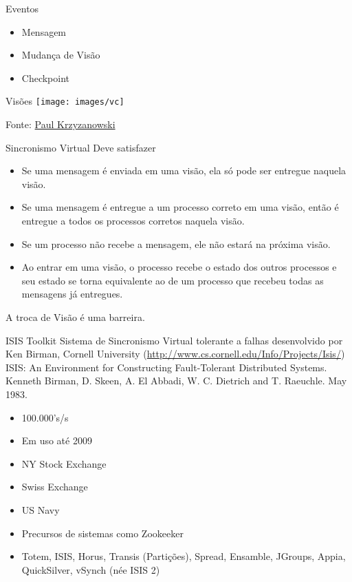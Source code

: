 \begin{frame}{Eventos}
\begin{itemize}
	\item Mensagem
	\item Mudança de Visão
	\item Checkpoint
\end{itemize}
\end{frame}

\begin{frame}{Visões}
\texttt{[image: images/vc]}

Fonte: \href{https://www.cs.rutgers.edu/~pxk/417/notes/virtual_synchrony.html}{Paul Krzyzanowski}
\end{frame}

\begin{frame}{Sincronismo Virtual}
Deve satisfazer
\begin{itemize}
	\item Se uma mensagem é enviada em uma visão, ela só pode ser entregue naquela visão.
	\item Se uma mensagem é entregue a um processo correto em uma visão, então é entregue a todos os processos corretos naquela visão.
	\item Se um processo não recebe a mensagem, ele não estará na próxima visão.
	\item Ao entrar em uma visão, o processo recebe o estado dos outros processos e seu estado se torna equivalente ao de um processo que recebeu todas as mensagens já entregues.
\end{itemize}

A troca de Visão é uma barreira.
\end{frame}

\begin{frame}{ISIS Toolkit}
	Sistema de Sincronismo Virtual tolerante a falhas desenvolvido por Ken Birman, Cornell University (\url{http://www.cs.cornell.edu/Info/Projects/Isis/})\\
	ISIS: An Environment for Constructing Fault-Tolerant Distributed Systems. Kenneth Birman, D. Skeen, A. El Abbadi, W. C. Dietrich and T. Raeuchle. May 1983.
	
\begin{itemize}
	\item 100.000's/s
	\item Em uso até 2009
	\item NY Stock Exchange
	\item Swiss Exchange
	\item US Navy
	\item Precursos de sistemas como Zookeeker
	\item Totem, ISIS, Horus, Transis (Partições), \alert{Spread}, \alert{Ensamble}, \alert{JGroups}, Appia, QuickSilver, vSynch (née ISIS 2)
\end{itemize}
\end{frame}

